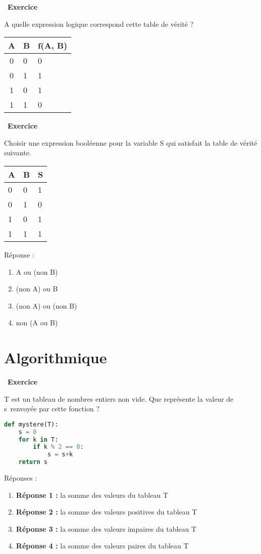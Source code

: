 \documentclass[
  11pt,
]{article}
\providecommand{\tightlist}{%
  \setlength{\itemsep}{0pt}\setlength{\parskip}{0pt}}
\newcounter{exo}
\newenvironment{exercice}[1]
{\par \medskip   \addtocounter{exo}{1} \noindent  
\begin{bclogo}[arrondi =0.1,   noborder = true, logo=\bccrayon, marge=4]{~\textbf{Exercice} \textbf{\theexo} {\itshape #1} }  \par}
{
\end{bclogo}
 \par \bigskip }
\newcounter{def}
\newcounter{alg}
\newcounter{logi}
\begin{document}
\begin{exercice}{}

A quelle expression logique correspond cette table de vérité ?

\begin{longtable}[]{@{}cll@{}}
\toprule
A & B & f(A, B)\tabularnewline
\midrule
\endhead
0 & 0 & 0\tabularnewline
0 & 1 & 1\tabularnewline
1 & 0 & 1\tabularnewline
1 & 1 & 0\tabularnewline
\bottomrule
\end{longtable}

\end{exercice}

\begin{exercice}{}

Choisir une expression booléenne pour la variable S qui satisfait la
table de vérité suivante.

\begin{longtable}[]{@{}lll@{}}
\toprule
A & B & S\tabularnewline
\midrule
\endhead
0 & 0 & 1\tabularnewline
0 & 1 & 0\tabularnewline
1 & 0 & 1\tabularnewline
1 & 1 & 1\tabularnewline
\bottomrule
\end{longtable}

Réponse :

\begin{enumerate}
\def\labelenumi{\arabic{enumi}.}
\tightlist
\item
  A ou (non B)
\item
  (non A) ou B
\item
  (non A) ou (non B)
\item
  non (A ou B)
\end{enumerate}

\end{exercice}

\hypertarget{algorithmique}{%
\section{Algorithmique}\label{algorithmique}}

\begin{exercice}{}

T est un tableau de nombres entiers non vide. Que représente la valeur
de s~renvoyée par cette fonction ?

\begin{lstlisting}[language=Python]
def mystere(T):
    s = 0
    for k in T:
        if k % 2 == 0:
            s = s+k
    return s
\end{lstlisting}

Réponses :

\begin{enumerate}
\def\labelenumi{\arabic{enumi}.}
\item
  \textbf{Réponse 1 :} la somme des valeurs du tableau T
\item
  \textbf{Réponse 2 :} la somme des valeurs positives du tableau T
\item
  \textbf{Réponse 3 :} la somme des valeurs impaires du tableau T
\item
  \textbf{Réponse 4 :} la somme des valeurs paires du tableau T
\end{enumerate}

\end{exercice}
\end{document}

